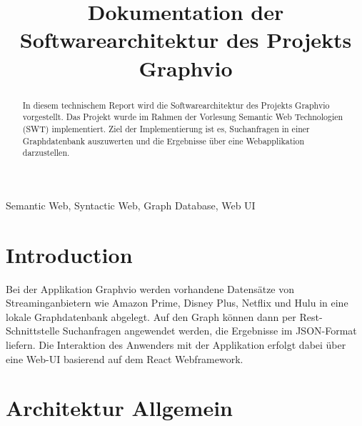 \documentclass[conference]{IEEEtran}
\begin{document}
\title{Dokumentation der Softwarearchitektur des Projekts Graphvio}


\author{
	\and

	\and

	\and

	\and

}

\maketitle

\begin{abstract}
In diesem technischem Report wird die Softwarearchitektur des Projekts 
Graphvio vorgestellt. Das Projekt wurde im Rahmen der Vorlesung Semantic 
Web Technologien (SWT) implementiert. Ziel der Implementierung ist es, 
Suchanfragen in einer Graphdatenbank auszuwerten und die Ergebnisse 
über eine Webapplikation darzustellen.
\end{abstract}

\begin{IEEEkeywords}
 Semantic Web, Syntactic Web, Graph Database, Web UI
\end{IEEEkeywords}

\section{Introduction}
Bei der Applikation Graphvio werden vorhandene Datensätze von Streaminganbietern wie 
Amazon Prime, Disney Plus, Netflix und Hulu in eine lokale Graphdatenbank abgelegt.
Auf den Graph können dann per Rest-Schnittstelle Suchanfragen angewendet werden, die Ergebnisse
im JSON-Format liefern. Die Interaktion des Anwenders mit der Applikation erfolgt dabei über eine Web-UI basierend auf dem 
React Webframework.

\section{Architektur Allgemein}
\end{document}
